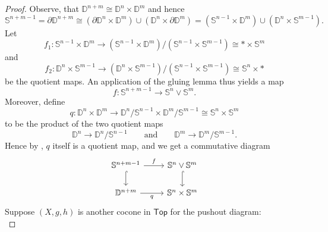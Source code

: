 \begin{proof}
	Observe, that $\mathbb{D}^{n + m} \cong \mathbb{D}^n \times \mathbb{D}^m$ and hence
	\begin{equation*}
		\mathbb{S}^{n + m - 1} = \partial \mathbb{D}^{n + m} \cong (\partial \mathbb{D}^n \times \mathbb{D}^m) \cup (\mathbb{D}^n \times \partial \mathbb{D}^m) = (\mathbb{S}^{n - 1} \times \mathbb{D}^m) \cup (\mathbb{D}^n \times \mathbb{S}^{m - 1}).
	\end{equation*}
	Let 
	\begin{equation*}
		f_1 : \mathbb{S}^{n - 1} \times \mathbb{D}^m \to (\mathbb{S}^{n - 1} \times \mathbb{D}^m) / (\mathbb{S}^{n - 1} \times \mathbb{S}^{m - 1}) \cong \ast \times \mathbb{S}^m
	\end{equation*}
	\noindent and
	\begin{equation*}
		f_2 : \mathbb{D}^n \times \mathbb{S}^{m - 1} \to (\mathbb{D}^n \times \mathbb{S}^{m - 1}) / (\mathbb{S}^{n - 1} \times \mathbb{S}^{m - 1}) \cong \mathbb{S}^n \times \ast
	\end{equation*}
	\noindent be the quotient maps. An application of the gluing lemma thus yields a map
	\begin{equation*}
		f : \mathbb{S}^{n + m - 1} \to \mathbb{S}^n \vee \mathbb{S}^m.
	\end{equation*}
	Moreover, define 
	\begin{equation*}
		q : \mathbb{D}^n \times \mathbb{D}^m \to \mathbb{D}^n/\mathbb{S}^{n - 1} \times \mathbb{D}^m/\mathbb{S}^{m - 1} \cong \mathbb{S}^n \times \mathbb{S}^m	
	\end{equation*}
	\noindent to be the product of the two quotient maps
	\begin{equation*}
		\mathbb{D}^n \to \mathbb{D}^n/\mathbb{S}^{n - 1} \qquad \text{and} \qquad \mathbb{D}^m \to \mathbb{D}^m/\mathbb{S}^{m - 1}.
	\end{equation*}
	Hence by \cite[186]{munkres:topology:2000}, $q$ itself is a quotient map, and we get a commutative diagram
	\begin{equation*}
		\begin{tikzcd}
			\mathbb{S}^{n + m - 1} \arrow[r,"f"]\arrow[d,hook] & \mathbb{S}^n \vee \mathbb{S}^m \arrow[d,hook]\\
			\mathbb{D}^{n + m} \arrow[r,"q"'] & \mathbb{S}^n \times \mathbb{S}^m
		\end{tikzcd}
	\end{equation*}
	Suppose $(X,g,h)$ is another cocone in $\mathsf{Top}$ for the pushout diagram:
	\begin{equation*}

\end{equation*}
\end{proof}
